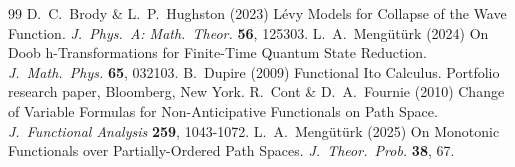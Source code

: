 \documentclass[12pt,a4paper]{article}
\begin{document}
\begin{thebibliography}{99}
%
 D.~C.~Brody \& L.~P.~Hughston (2023) L\'evy Models for Collapse of the Wave Function. \textit{J.~Phys.~A: Math.~Theor.}  {\bf 56}, 125303. 
%
 L.~A.~Meng\"ut\"urk (2024) On Doob h-Transformations for Finite-Time Quantum State Reduction. \textit{J.~Math.~Phys.} {\bf 65}, 032103.
%
 B.~Dupire (2009) Functional Ito Calculus. Portfolio research paper, Bloomberg, New York.
%
 R.~Cont \& D.~A.~Fournie (2010) Change of Variable Formulas for Non-Anticipative Functionals on Path Space. \textit{J.~Functional Analysis} {\bf 259}, 1043-1072.
%
 L.~A.~Meng\"ut\"urk (2025) On Monotonic Functionals over Partially-Ordered Path Spaces. \textit{J.~Theor.~Prob.} {\bf 38}, 67.
\end{thebibliography}
\end{document}
